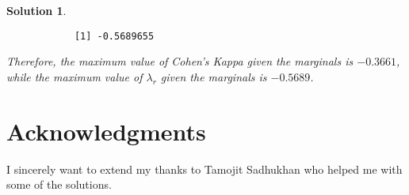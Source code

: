 \documentclass[12pt]{article}
\theoremstyle{problemstyle}
\newtheorem*{solution*}{Solution}
\begin{document}
\begin{solution*}
\begin{enumerate}
	\begin{verbatim}
			[1] -0.5689655
	\end{verbatim}
			
	Therefore, the maximum value of Cohen's Kappa given the marginals is \(-0.3661\), while the maximum value of \(\lambda_r\) given the marginals is \(-0.5689\).
			
	
\end{enumerate}
\end{solution*}

\section*{Acknowledgments}
\qquad I sincerely want to extend my thanks to Tamojit Sadhukhan who helped me with some of the solutions.
\end{document}
